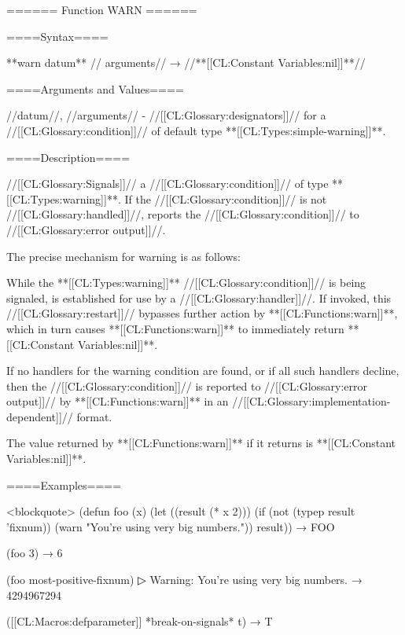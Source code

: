 ====== Function WARN ======

====Syntax====

**warn {datum** //\rest} arguments// → //**[[CL:Constant Variables:nil]]**//

====Arguments and Values====

//datum//, //arguments// - //[[CL:Glossary:designators]]// for a //[[CL:Glossary:condition]]// of default type **[[CL:Types:simple-warning]]**.

====Description====

//[[CL:Glossary:Signals]]// a //[[CL:Glossary:condition]]// of type **[[CL:Types:warning]]**. If the //[[CL:Glossary:condition]]// is not //[[CL:Glossary:handled]]//, reports the //[[CL:Glossary:condition]]// to //[[CL:Glossary:error output]]//.

The precise mechanism for warning is as follows:

\beginlist


While the **[[CL:Types:warning]]** //[[CL:Glossary:condition]]// is being signaled,  is established for use by a //[[CL:Glossary:handler]]//. If invoked, this //[[CL:Glossary:restart]]// bypasses further action by **[[CL:Functions:warn]]**, which in turn causes **[[CL:Functions:warn]]** to immediately return **[[CL:Constant Variables:nil]]**.


If no handlers for the warning condition are found, or if all such handlers decline, then the //[[CL:Glossary:condition]]// is reported to //[[CL:Glossary:error output]]// by **[[CL:Functions:warn]]** in an //[[CL:Glossary:implementation-dependent]]// format.


The value returned by **[[CL:Functions:warn]]** if it returns is **[[CL:Constant Variables:nil]]**. \endlist

====Examples====

<blockquote> (defun foo (x) (let ((result (* x 2))) (if (not (typep result 'fixnum)) (warn "You're using very big numbers.")) result)) → FOO

(foo 3) → 6

(foo most-positive-fixnum)
▷ Warning: You're using very big numbers. → 4294967294

([[CL:Macros:defparameter]] *break-on-signals* t) → T

